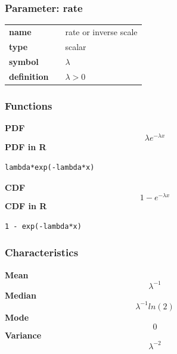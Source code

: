 \subsubsection*{Parameter: rate}

\noindent\begin{tabular}{p{2cm}cl}
\textbf{name} & & rate or inverse scale \\
\textbf{type} & & scalar \\
\textbf{symbol} & & $\lambda$  \\
\textbf{definition} & & $\lambda > 0$
\end{tabular}
\subsubsection*{Functions}

\smallskip \noindent \hspace{.2cm} \textbf{PDF} 
\begin{equation*}\lambda e^{-\lambda x}\end{equation*}
\smallskip \noindent \hspace{.2cm} \textbf{PDF in R}  
\begin{verbatim}lambda*exp(-lambda*x)\end{verbatim}
\smallskip \noindent \hspace{.2cm} \textbf{CDF} 
\begin{equation*}1 - e^{-\lambda x}\end{equation*}
\smallskip \noindent \hspace{.2cm} \textbf{CDF in R} 
\begin{verbatim}1 - exp(-lambda*x)\end{verbatim}
\smallskip
\subsubsection*{Characteristics}
\smallskip \noindent \hspace{.2cm} \textbf{Mean} 
\begin{equation*}\lambda^{-1}\end{equation*}
\smallskip \noindent \hspace{.2cm} \textbf{Median} 
\begin{equation*}\lambda^{-1} ln(2)\end{equation*}
\smallskip \noindent \hspace{.2cm} \textbf{Mode} 
\begin{equation*}0\end{equation*}
\smallskip \noindent \hspace{.2cm} \textbf{Variance} 
\begin{equation*}\lambda^{-2}\end{equation*}
\smallskip
